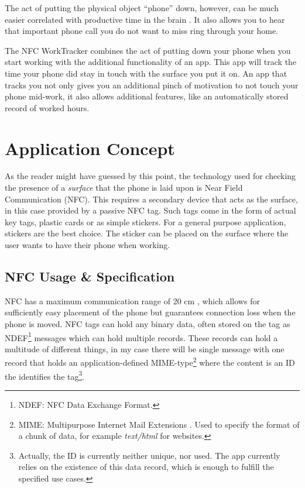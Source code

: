\documentclass[conference]{IEEEtran}
\newcommand{\projectname}{NFC WorkTracker}
\begin{document}
The act of putting the physical object ``phone'' down, however, can be much easier correlated with productive time in the brain \cite{hbr-smartphone-nearby}. It also allows you to hear that important phone call you do not want to miss ring through your home.

The {\projectname} combines the act of putting down your phone when you start working with the additional functionality of an app. This app will track the time your phone did stay in touch with the surface you put it on. An app that tracks you not only gives you an additional pinch of motivation to not touch your phone mid-work, it also allows additional features, like an automatically stored record of worked hours.

\section{Application Concept}
As the reader might have guessed by this point, the technology used for checking the presence of a \textit{surface} that the phone is laid upon is Near Field Communication (NFC). This requires a secondary device that acts as the surface, in this case provided by a passive NFC tag. Such tags come in the form of actual key tags, plastic cards or as simple stickers. For a general purpose application, stickers are the best choice. The sticker can be placed on the surface where the user wants to have their phone when working.

\subsection{NFC Usage \& Specification}	
\label{sec:nfc-details}
NFC has a maximum communication range of 20 cm \cite{nfcsurvey}, which allows for sufficiently easy placement of the phone but guarantees connection loss when the phone is moved. NFC tags can hold any binary data, often stored on the tag as NDEF\footnote{NDEF: NFC Data Exchange Format.} messages which can hold multiple records. These records can hold a multitude of different things, in my case there will be single message with one record that holds an application-defined MIME-type\footnote{MIME: Multipurpose Internet Mail Extensions \cite{rfc2046}. Used to specify the format of a chunk of data, for example \textit{text/html} for websites.} \cite{rfc2046} where the content is an ID the identifies the tag\footnote{Actually, the ID is currently neither unique, nor used. The app currently relies on the existence of this data record, which is enough to fulfill the specified use cases.}.
\end{document}
